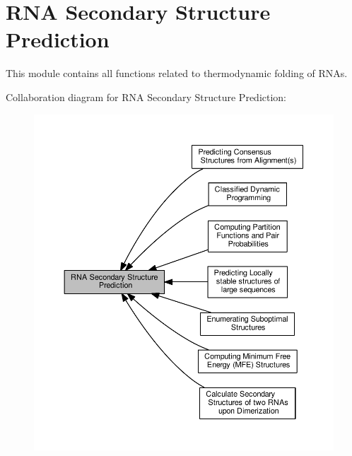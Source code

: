 \hypertarget{group__folding__routines}{}\section{R\+NA Secondary Structure Prediction}
\label{group__folding__routines}


This module contains all functions related to thermodynamic folding of R\+N\+As.  


Collaboration diagram for R\+NA Secondary Structure Prediction\+:
\nopagebreak
\begin{figure}[H]
\begin{center}
\leavevmode
\includegraphics[width=350pt]{group__folding__routines}
\end{center}
\end{figure}
